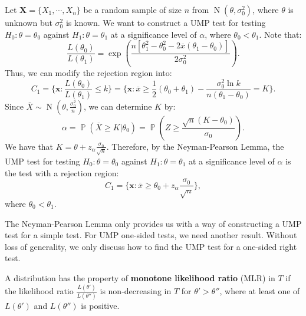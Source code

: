 \documentclass{huhtakm-template-book-v2}
\DeclareMathOperator{\prob}{\mathbb{P}}
\DeclareMathOperator{\N}{N}
\begin{document}
    \begin{eg}
        Let $\mathbf{X}=\{X_{1},\cdots,X_{n}\}$ be a random sample of size $n$ from $\N(\theta,\sigma_{0}^{2})$, where $\theta$ is unknown but $\sigma_{0}^{2}$ is known. We want to construct a UMP test for testing $H_{0}:\theta=\theta_{0}$ against $H_{1}:\theta=\theta_{1}$ at a significance level of $\alpha$, where $\theta_{0}<\theta_{1}$. Note that:
        \begin{equation*}
            \frac{L(\theta_{0})}{L(\theta_{1})}=\exp\left(\frac{n[\theta_{1}^{2}-\theta_{0}^{2}-2\overline{x}(\theta_{1}-\theta_{0})]}{2\sigma_{0}^{2}}\right).
        \end{equation*}
        Thus, we can modify the rejection region into:
        \begin{equation*}
            C_{1}=\biggl\{\mathbf{x}:\frac{L(\theta_{0})}{L(\theta_{1})}\leq k\biggr\}=\biggl\{\mathbf{x}:\overline{x}\geq \frac{1}{2}(\theta_{0}+\theta_{1})-\frac{\sigma_{0}^{2}\ln{k}}{n(\theta_{1}-\theta_{0})}=K\biggr\}.
        \end{equation*}
        Since $\overline{X}\sim\N(\theta,\frac{\sigma_{0}^{2}}{n})$, we can determine $K$ by:
        \begin{equation*}
            \alpha=\prob(\overline{X}\geq K|\theta_{0})=\prob\left(Z\geq\frac{\sqrt{n}(K-\theta_{0})}{\sigma_{0}}\right).
        \end{equation*}
        We have that $K=\theta+z_{\alpha}\frac{\sigma_{0}}{\sqrt{n}}$. Therefore, by the Neyman-Pearson Lemma, the UMP test for testing $H_{0}:\theta=\theta_{0}$ against $H_{1}:\theta=\theta_{1}$ at a significance level of $\alpha$ is the test with a rejection region:
        \begin{equation*}
            C_{1}=\biggl\{\mathbf{x}:\overline{x}\geq\theta_{0}+z_{\alpha}\frac{\sigma_{0}}{\sqrt{n}}\biggr\},
        \end{equation*}
        where $\theta_{0}<\theta_{1}$.
    \end{eg}
    The Neyman-Pearson Lemma only provides us with a way of constructing a UMP test for a simple test. For UMP one-sided tests, we need another result. Without loss of generality, we only discuss how to find the UMP test for a one-sided right test.
    \begin{defn}
        A distribution has the property of \textbf{monotone likelihood ratio} (MLR) in $T$ if the likelihood ratio $\frac{L(\theta')}{L(\theta'')}$ is non-decreasing in $T$ for $\theta'>\theta''$, where at least one of $L(\theta')$ and $L(\theta'')$ is positive.
    \end{defn}
\end{document}

